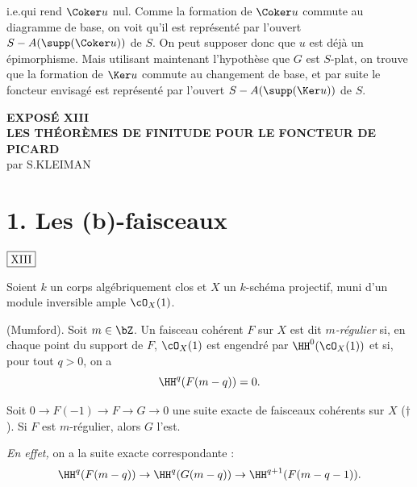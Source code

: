 \noindent
i.e.\@ qui rend $\Coker u$ nul. Comme la formation de $\Coker u$ commute au diagramme de base, on voit qu'il est représenté par l'ouvert $S - A(\supp(\Coker u))$ de $S$. On peut supposer donc que $u$ est déjà un épimorphisme. Mais utilisant maintenant l'hypothèse que $G$ est $S$-plat, on trouve que la formation de $\Ker u$ commute au changement de base, et par suite le foncteur envisagé est représenté par l'ouvert $S - A(\supp(\Ker u))$ de $S$.

\begin{center}
{\Large\bfseries EXPOSÉ XIII}\\[0.5em]
{\Large\bfseries LES THÉORÈMES DE FINITUDE POUR LE FONCTEUR DE PICARD}\\[1em]
{\large par S.\@ KLEIMAN}
\end{center}

\section*{1. Les (b)-faisceaux}

\begin{flushright}
$\fbox{\text{XIII}}$
\end{flushright}

Soient $k$ un corps algébriquement clos et $X$ un $k$-schéma projectif, muni d'un module inversible ample $\cO_X(1)$.

\begin{defn}\label{def:1.1} \textup{(Mumford).} Soit $m \in \bZ$. Un faisceau cohérent $F$ sur $X$ est dit \emph{$m$-régulier} si, en chaque point du support de $F$, $\cO_X(1)$ est engendré par $\HH^0(\cO_X(1))$ et si, pour tout $q > 0$, on a
\[
\HH^q(F(m-q)) = 0.
\]
\end{defn}

\begin{lem}\label{lem:1.2} Soit $0 \to F(-1) \to F \to G \to 0$ une suite exacte de faisceaux cohérents sur $X$\textup{ ($\dagger$)}. Si $F$ est $m$-régulier, alors $G$ l'est.
\end{lem}

\noindent\textit{En effet,} on a la suite exacte correspondante :
\[
\HH^q(F(m-q)) \to \HH^q(G(m-q)) \to \HH^{q+1}(F(m-q-1)).
\]

